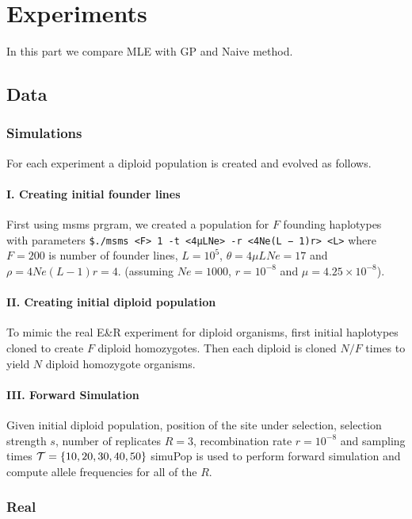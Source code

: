 \section{Experiments}
In this part we compare MLE with GP and Naive method. 
\subsection{Data}
\subsubsection{Simulations}
For each experiment a diploid population is created and evolved as follows. 
\paragraph{I. Creating initial founder lines}
First using msms prgram, we created a population for $F$ founding haplotypes with parameters \texttt{\$./msms <F> 1 -t <4μLNe> -r <4Ne(L − 1)r> <L>} where $F=200$ is number of founder lines, 
$L=10^5$, $\theta=4\mu LNe=17$ and $\rho=4Ne(L-1)r=4$.  (assuming $Ne=1000$, $r=10^{-8}$ and $\mu=4.25\times 10^{-8}$).  
\paragraph{II. Creating initial diploid population} 
To mimic the real E\&R experiment for diploid organisms, first initial haplotypes cloned to create $F$ diploid homozygotes. Then each diploid is cloned $N/F$ times to yield $N$ diploid homozygote organisms.
\paragraph{III. Forward Simulation}
Given initial diploid population, position of the site under selection, selection strength $s$, number of replicates $R=3$, recombination rate $r=10^{-8}$ and sampling times ${\cal T}=\{10,20,30,40,50\}$ simuPop is used to perform forward simulation and compute allele frequencies for all of the $R$.

\subsubsection{Real}

